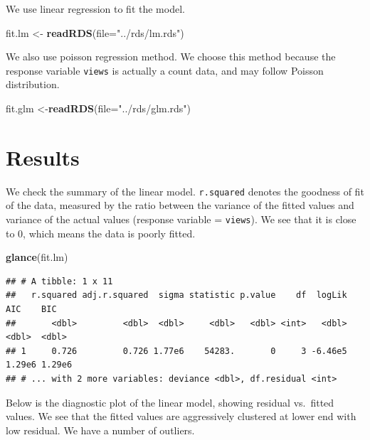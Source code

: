 \documentclass[]{article}
\newenvironment{Shaded}{\begin{snugshade}}{\end{snugshade}}
\newcommand{\DataTypeTok}[1]{\textcolor[rgb]{0.13,0.29,0.53}{#1}}
\newcommand{\KeywordTok}[1]{\textcolor[rgb]{0.13,0.29,0.53}{\textbf{#1}}}
\newcommand{\NormalTok}[1]{#1}
\newcommand{\StringTok}[1]{\textcolor[rgb]{0.31,0.60,0.02}{#1}}
\begin{document}
We use linear regression to fit the model.

\begin{Shaded}
\begin{Highlighting}[]
\NormalTok{fit.lm <-}\StringTok{ }\KeywordTok{readRDS}\NormalTok{(}\DataTypeTok{file=}\StringTok{"../rds/lm.rds"}\NormalTok{)}
\end{Highlighting}
\end{Shaded}

We also use poisson regression method. We choose this method because the
response variable \texttt{views} is actually a count data, and may
follow Poisson distribution.

\begin{Shaded}
\begin{Highlighting}[]
\NormalTok{fit.glm <-}\KeywordTok{readRDS}\NormalTok{(}\DataTypeTok{file=}\StringTok{"../rds/glm.rds"}\NormalTok{)}
\end{Highlighting}
\end{Shaded}

\hypertarget{results}{%
\section{Results}\label{results}}

We check the summary of the linear model. \texttt{r.squared} denotes the
goodness of fit of the data, measured by the ratio between the variance
of the fitted values and variance of the actual values (response
variable = \texttt{views}). We see that it is close to 0, which means
the data is poorly fitted.

\begin{Shaded}
\begin{Highlighting}[]
\KeywordTok{glance}\NormalTok{(fit.lm)}
\end{Highlighting}
\end{Shaded}

\begin{verbatim}
## # A tibble: 1 x 11
##   r.squared adj.r.squared  sigma statistic p.value    df  logLik    AIC    BIC
##       <dbl>         <dbl>  <dbl>     <dbl>   <dbl> <int>   <dbl>  <dbl>  <dbl>
## 1     0.726         0.726 1.77e6    54283.       0     3 -6.46e5 1.29e6 1.29e6
## # ... with 2 more variables: deviance <dbl>, df.residual <int>
\end{verbatim}

Below is the diagnostic plot of the linear model, showing residual
vs.~fitted values. We see that the fitted values are aggressively
clustered at lower end with low residual. We have a number of outliers.
\end{document}
